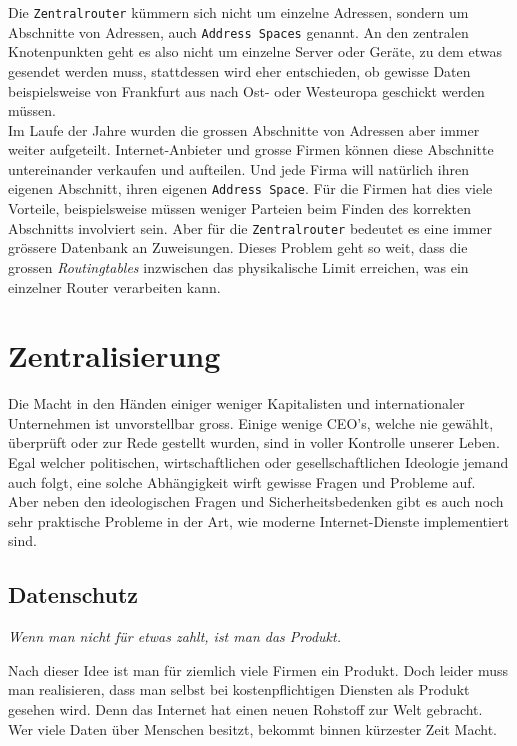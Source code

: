 \documentclass[11pt]{report}
\begin{document}
\noindent Die \texttt{Zentralrouter} kümmern sich nicht um einzelne Adressen,
sondern um Abschnitte von Adressen, auch \texttt{Address Spaces} genannt. An
den zentralen Knotenpunkten geht es also nicht um einzelne Server oder
Geräte, zu dem etwas gesendet werden muss, stattdessen wird eher
entschieden, ob gewisse Daten beispielsweise von Frankfurt aus nach
Ost- oder Westeuropa geschickt werden müssen.\\

\noindent Im Laufe der Jahre wurden die grossen Abschnitte von
Adressen aber immer weiter aufgeteilt. Internet-Anbieter und grosse
Firmen können diese Abschnitte untereinander verkaufen und aufteilen.
Und jede Firma will natürlich ihren eigenen Abschnitt, ihren eigenen
\texttt{Address Space}. Für die Firmen hat dies viele Vorteile, beispielsweise
müssen weniger Parteien beim Finden des korrekten Abschnitts
involviert sein. Aber für die \texttt{Zentralrouter} bedeutet es eine immer
grössere Datenbank an Zuweisungen. Dieses Problem geht so weit, dass
die grossen \emph{Routingtables} inzwischen das physikalische Limit
erreichen, was ein einzelner Router verarbeiten kann.
\chapter{Zentralisierung}
\label{sec:orgcfc206a}
\noindent Die Macht in den Händen einiger weniger Kapitalisten und
internationaler Unternehmen ist unvorstellbar gross. Einige wenige
CEO's, welche nie gewählt, überprüft oder zur Rede gestellt wurden,
sind in voller Kontrolle unserer Leben. Egal welcher politischen,
wirtschaftlichen oder gesellschaftlichen Ideologie jemand auch folgt,
eine solche Abhängigkeit wirft gewisse Fragen und Probleme auf.\\

\noindent Aber neben den ideologischen Fragen und Sicherheitsbedenken
gibt es auch noch sehr praktische Probleme in der Art, wie moderne
Internet-Dienste implementiert sind.
\section{Datenschutz}
\label{sec:org3d167e0}
\begin{center}
\emph{Wenn man nicht für etwas zahlt, ist man das Produkt.}
\end{center}
Nach dieser Idee ist man für ziemlich viele Firmen ein Produkt. Doch
leider muss man realisieren, dass man selbst bei kostenpflichtigen
Diensten als Produkt gesehen wird. Denn das Internet hat einen neuen
Rohstoff zur Welt gebracht. Wer viele Daten über Menschen besitzt,
bekommt binnen kürzester Zeit Macht.\\
\end{document}
